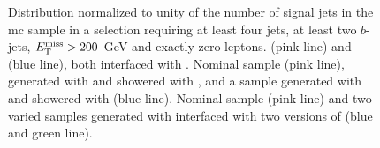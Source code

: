 \begin{figure}[htb]
\centering 
{}
\caption{Distribution normalized to unity of the number of signal jets in the \ttbar \gls{mc} sample in a selection requiring at least four jets, at least two $b$-jets, $E_{\rm T}^{\mathrm{miss}}>200$ GeV and exactly zero leptons. 
 \PowhegBox (pink line) and \aNLO (blue line), both interfaced with \HWpp.
 Nominal sample (pink line), generated with \PowhegBox and showered with \PY, and a sample generated with \PowhegBox and showered with \HWpp (blue line).
 Nominal sample (pink line) and two varied samples generated with \PowhegBox interfaced with two versions of \PY (blue and green line).
}\label{fig:ttbar_nj_0L_syst}
\end{figure}

